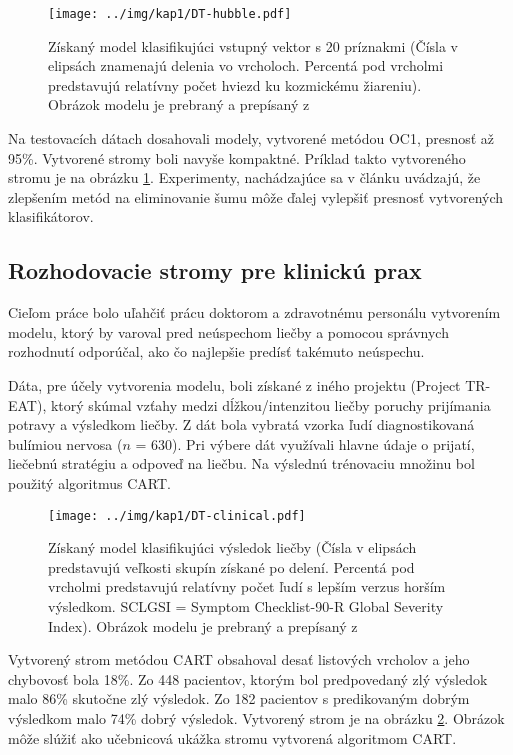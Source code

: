 \begin{figure}[h]
\centering
\centerline{\mbox{\texttt{[image: ../img/kap1/DT-hubble.pdf]}}}
\caption{Získaný model klasifikujúci vstupný vektor s 20 príznakmi (Čísla v elipsách znamenajú delenia vo vrcholoch. Percentá pod vrcholmi predstavujú relatívny počet hviezd ku kozmickému žiareniu). Obrázok modelu je prebraný a prepísaný z \cite[str. 284]{online-astronomy}}\label{fig:HubbleTree}
\end{figure}

Na testovacích dátach dosahovali modely, vytvorené metódou OC1, presnosť až 95\%. Vytvorené stromy boli navyše kompaktné. Príklad takto vytvoreného stromu je na obrázku \ref{fig:HubbleTree}. Experimenty, nachádzajúce sa v článku uvádzajú, že zlepšením metód na eliminovanie šumu môže ďalej vylepšiť presnosť vytvorených klasifikátorov.

\subsection{Rozhodovacie stromy pre klinickú prax}\label{kap1:2.8:2.8.3:Clinical}
Cieľom práce bolo uľahčiť prácu doktorom a zdravotnému personálu vytvorením modelu, ktorý by varoval pred neúspechom liečby a pomocou správnych rozhodnutí odporúčal, ako čo najlepšie predísť takémuto neúspechu. 

Dáta, pre účely vytvorenia modelu, boli získané z iného projektu (Project TR-EAT), ktorý skúmal vzťahy medzi dĺžkou/intenzitou liečby poruchy prijímania potravy a výsledkom liečby. Z dát bola vybratá vzorka ľudí diagnostikovaná bulímiou nervosa ($n$ = 630). Pri výbere dát využívali hlavne údaje o prijatí, liečebnú stratégiu a odpoveď na liečbu. Na výslednú trénovaciu množinu bol použitý algoritmus CART.

\begin{figure}[h]
\centering
\centerline{\mbox{\texttt{[image: ../img/kap1/DT-clinical.pdf]}}}
\caption{Získaný model klasifikujúci výsledok liečby (Čísla v elipsách predstavujú veľkosti skupín získané po delení. Percentá pod vrcholmi predstavujú relatívny počet ľudí s lepším verzus horším výsledkom. SCLGSI = Symptom Checklist-90-R Global Severity Index). Obrázok modelu je prebraný a prepísaný z \cite[s. 454]{online-psychoterapy}}\label{fig:ClinicalTree}
\end{figure}

Vytvorený strom metódou CART obsahoval desať listových vrcholov a jeho chybovosť bola 18\%. Zo 448 pacientov, ktorým bol predpovedaný zlý výsledok malo 86\% skutočne zlý výsledok. Zo 182 pacientov s predikovaným dobrým výsledkom malo 74\% dobrý výsledok. Vytvorený strom je na obrázku \ref{fig:ClinicalTree}. Obrázok môže slúžiť ako učebnicová ukážka stromu vytvorená algoritmom CART.